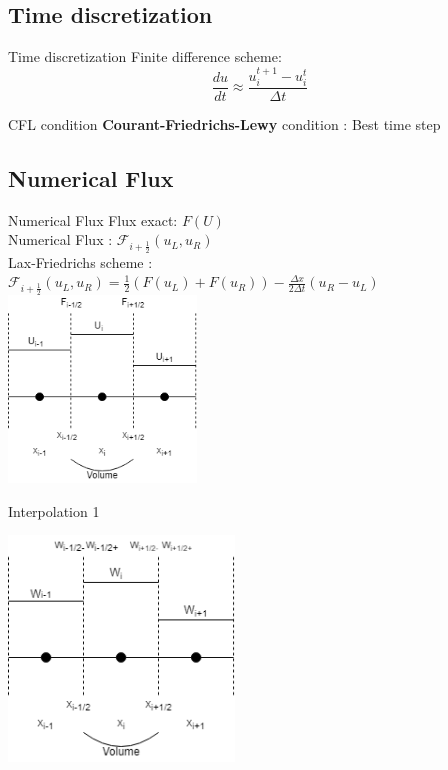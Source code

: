 \documentclass{beamer}
\begin{document}
        \subsection{Time discretization}
            \begin{frame}{Time discretization}
                Finite difference scheme:
                \begin{equation*}
                    \frac{du}{dt}\approx \frac{u_i^{t+1}-u_i^t}{\Delta t}
                \end{equation*}
            \end{frame}
            \begin{frame}{CFL condition}
                \textbf{Courant-Friedrichs-Lewy} condition : Best time step
                
            \end{frame}
        
        \subsection{Numerical Flux}
            \begin{frame}{Numerical Flux}\pause
                Flux exact: $F(U)$ \pause \\
                Numerical Flux : $\mathcal{F}_{i+\frac{1}{2}}(u_L, u_R)$ \pause \\
                Lax-Friedrichs scheme : $\mathcal{F}_{i+\frac{1}{2}}(u_L, u_R) =  \frac{1}{2}(F(u_L) + F(u_R)) - \frac{\Delta x}{2\Delta t}(u_R-u_L)$ 
                \includegraphics[width=5cm]{FluxBurger.png}
            \end{frame}
            \begin{frame}{Interpolation 1}
                \begin{center}
                    \includegraphics[width=6cm]{1storder.png}
                \end{center}
            \end{frame}
            
\end{document}
